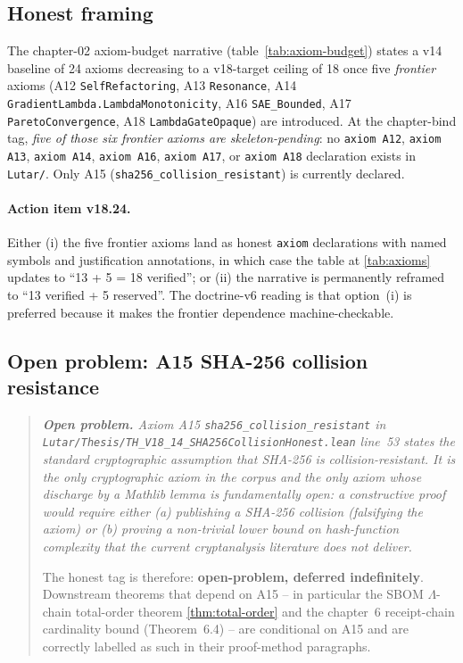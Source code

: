 \subsection{Honest framing}

The chapter-02 axiom-budget narrative (table~\ref{tab:axiom-budget})
states a v14 baseline of 24 axioms decreasing to a v18-target ceiling
of 18 once five \emph{frontier} axioms (A12 \texttt{SelfRefactoring},
A13 \texttt{Resonance}, A14 \texttt{GradientLambda.LambdaMonotonicity},
A16 \texttt{SAE\_Bounded}, A17 \texttt{ParetoConvergence},
A18 \texttt{LambdaGateOpaque}) are introduced. At the chapter-bind
tag, \emph{five of those six frontier axioms are skeleton-pending}:
no \texttt{axiom A12}, \texttt{axiom A13}, \texttt{axiom A14},
\texttt{axiom A16}, \texttt{axiom A17}, or \texttt{axiom A18}
declaration exists in \texttt{Lutar/}. Only A15
(\texttt{sha256\_collision\_resistant}) is currently declared.

\paragraph{Action item v18.24.} Either (i) the five frontier axioms
land as honest \texttt{axiom} declarations with named symbols and
justification annotations, in which case the table at
\ref{tab:axioms} updates to ``13 + 5 = 18 verified''; or (ii) the
narrative is permanently reframed to ``13 verified + 5 reserved''.
The doctrine-v6 reading is that option~(i) is preferred because it
makes the frontier dependence machine-checkable.

\subsection{Open problem: A15 SHA-256 collision resistance}

\begin{quotation}\itshape
\noindent\textbf{Open problem.} Axiom A15
\texttt{sha256\_collision\_resistant} in
\texttt{Lutar/Thesis/TH\_V18\_14\_SHA256CollisionHonest.lean} line~53
states the standard cryptographic assumption that SHA-256 is
collision-resistant. It is the only \emph{cryptographic} axiom in
the corpus and the only axiom whose discharge by a Mathlib lemma is
fundamentally open: a constructive proof would require either (a)
publishing a SHA-256 collision (falsifying the axiom) or (b)
proving a non-trivial lower bound on hash-function complexity that
the current cryptanalysis literature does not deliver.

The honest tag is therefore: \textbf{open-problem, deferred
indefinitely}. Downstream theorems that depend on A15 -- in
particular the SBOM $\Lambda$-chain total-order theorem
\ref{thm:total-order} and the chapter~6 receipt-chain cardinality
bound (Theorem~6.4) -- are conditional on A15 and are correctly
labelled as such in their proof-method paragraphs.
\end{quotation}

